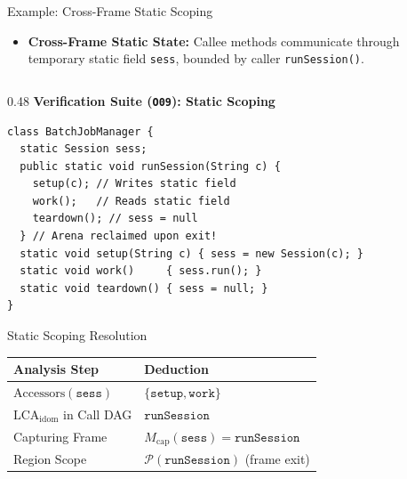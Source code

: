 \documentclass[11pt]{beamer}
\begin{document}
\begingroup
{}
\begin{frame}[fragile]{Example: Cross-Frame Static Scoping}
  \begin{itemize}
    \small
    \item \textbf{Cross-Frame Static State:} Callee methods communicate through temporary static field \texttt{sess}, bounded by caller \texttt{runSession()}.
  \end{itemize}
  \vspace{-0.6em}

  \begin{columns}[T,onlytextwidth]
    \begin{column}{0.48\textwidth}
      {\scriptsize\bfseries\color{darkblue} Verification Suite (\texttt{O09}): Static Scoping}\\[1pt]
\begin{lstlisting}[style=javacodetiny, basicstyle=\fontsize{6.0pt}{7.4pt}\selectfont\ttfamily]
class BatchJobManager {
  static Session sess;
  public static void runSession(String c) {
    setup(c); // Writes static field
    work();   // Reads static field
    teardown(); // sess = null
  } // Arena reclaimed upon exit!
  static void setup(String c) { sess = new Session(c); }
  static void work()     { sess.run(); }
  static void teardown() { sess = null; }
}
\end{lstlisting}
      \vspace{-0.5em}

      \begin{block}{Static Scoping Resolution}
        \fontsize{6.4pt}{7.6pt}\selectfont
        \begin{tabular}{@{}ll@{}}
          \toprule
          \textbf{Analysis Step} & \textbf{Deduction} \\
          \midrule
          $\text{Accessors}(\texttt{sess})$ & $\{\texttt{setup}, \texttt{work}\}$ \\
          $\text{LCA}_{\text{idom}}$ in Call DAG & $\texttt{runSession}$ \\
          Capturing Frame & $M_{\text{cap}}(\texttt{sess}) = \texttt{runSession}$ \\
          Region Scope & $\mathcal{P}(\texttt{runSession})$ (frame exit) \\
          \bottomrule
        \end{tabular}
      \end{block}
    \end{column}


\end{columns}
\end{frame}
\end{document}
